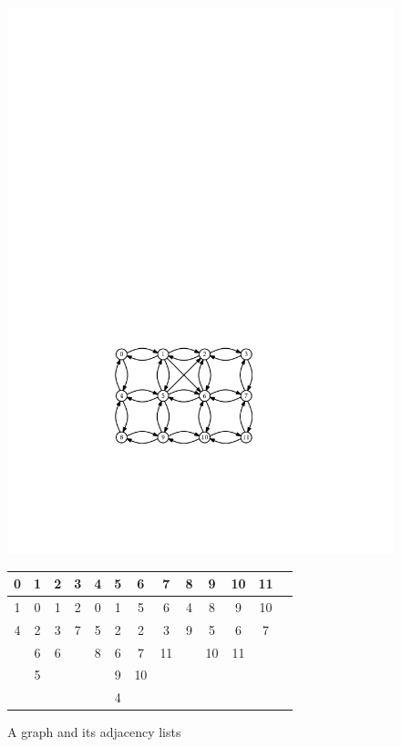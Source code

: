 \begin{figure}
	\begin{center}
		\includegraphics[scale=0.90909]{figs/graph} \\[3ex]
		\begin{tabular}{|c|c|c|c|c|c|c|c|c|c|c|c|c|}\hline
			0&1&2&3&4&5&6 &7 &8&9 &10&11 \\\hline
			1&0&1&2&0&1&5 &6 &4&8 &9 &10 \\
			4&2&3&7&5&2&2 &3 &9&5 &6 &7 \\
			&6&6& &8&6&7 &11& &10&11& \\
			&5& & & &9&10&  & &  &  & \\
			& & & & &4&  &  & &  &  & \\
		\end{tabular} 
	\end{center}
	\caption{A graph and its adjacency lists}
\end{figure}



